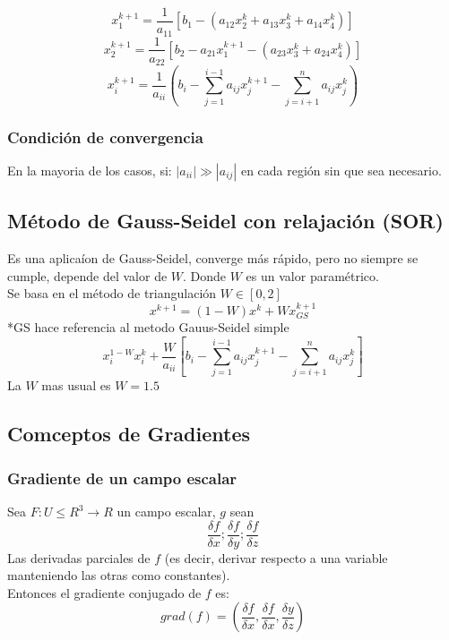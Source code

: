 \begin{displaymath}
x_1^{k+1}=\frac{1}{a_{11}}[b_1-(a_{12}x_2^k+a_{13}x_3^k+a_{14}x_4^k)]
\end{displaymath}
\begin{displaymath}
x_2^{k+1}=\frac{1}{a_{22}}[b_2-a_{21}x_1^{k+1}-(a_{23}x_3^k+a_{24}x_4^k)]
\end{displaymath}
\begin{displaymath}
x_i^{k+1}=\frac{1}{a_{ii}}(b_i-\sum_{j=1}^{i-1}a_{ij}x_j^{k+1}-\sum_{j=i+1}^{n}a_{ij}x_j^k)
\end{displaymath}
\subsubsection*{Condici\'on de convergencia}
En la mayoria de los casos, si: $|a_{ii}|\gg|a_{ij}|$ en cada regi\'on sin que sea necesario.
\subsection{M\'etodo de Gauss-Seidel con relajaci\'on (SOR)}
Es una aplica\'ion de Gauss-Seidel, converge m\'as r\'apido, pero no siempre se cumple, depende del valor de $W$. Donde $W$ es un valor param\'etrico.\\
Se basa en el m\'etodo de triangulaci\'on $W\in[0,2]$
\begin{displaymath}
x^{k+1}=(1-W)x^k+Wx_{GS}^{k+1}
\end{displaymath}
*GS hace referencia al metodo Gauus-Seidel simple
\begin{displaymath}
x_{i}^{1-W}x_i^k+\frac{W}{a_{ii}}\left[ b_i-\sum_{j=1}^{i-1}a_{ij}x_j^{k+1}-\sum_{j=i+1}^{n}a_{ij}x_j^k\right]
\end{displaymath}
La $W$ mas usual es $W=1.5$

\subsection*{Comceptos de Gradientes}

\subsubsection*{Gradiente de un campo escalar}
Sea $F:U\leq R^3\rightarrow R$ un campo escalar, $g$ sean
\begin{displaymath}
\frac{\delta f}{\delta x}; \frac{\delta f}{\delta y}; \frac{\delta f}{\delta z}
\end{displaymath}
Las derivadas parciales de $f$ (es decir, derivar respecto a una variable manteniendo las otras como constantes).\\
Entonces el gradiente conjugado de $f$ es:
\begin{displaymath}
grad(f)=\left(\frac{\delta f}{\delta x},\frac{\delta f}{\delta x},\frac{\delta y}{\delta z}\right)
\end{displaymath}

